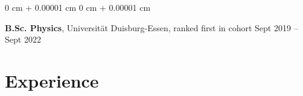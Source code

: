 \documentclass[10pt, letterpaper]{article}
\newenvironment{highlights}{
    \begin{itemize}[
        topsep=0.10 cm,
        parsep=0.10 cm,
        partopsep=0pt,
        itemsep=0pt,
        leftmargin=0 cm + 10pt
    ]
}{
    \end{itemize}
} %
\newenvironment{onecolentry}{
    \begin{adjustwidth}{
        0 cm + 0.00001 cm
    }{
        0 cm + 0.00001 cm
    }
}{
    \end{adjustwidth}
} %
\newenvironment{twocolentry}[2][]{
    \onecolentry
    \def\secondColumn{#2}
    \setcolumnwidth{\fill, 4.5 cm}
    \begin{paracol}{2}
}{
    \switchcolumn \raggedleft \secondColumn
    \end{paracol}
    \endonecolentry
} %
\begin{document}

        \vspace{0.2 cm}

        \begin{twocolentry}{
            Sept 2019 – Sept 2022
        }
            \textbf{B.Sc. Physics}, Universität Duisburg-Essen, ranked first in cohort\end{twocolentry}


    \section{Experience}









\end{document}
